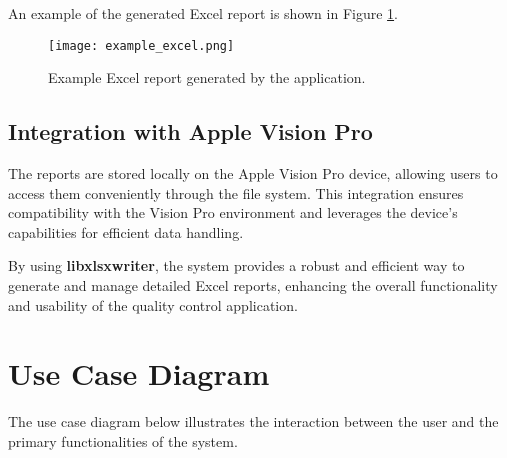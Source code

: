 An example of the generated Excel report is shown in Figure \ref{fig:example_excel}.
\begin{figure}[h!]
    \centering
    \texttt{[image: example\_excel.png]} %
    \caption{Example Excel report generated by the application.}
    \label{fig:example_excel}
\end{figure}

\subsection{Integration with Apple Vision Pro}
The reports are stored locally on the Apple Vision Pro device, allowing users to access them conveniently through the file system. This integration ensures compatibility with the Vision Pro environment and leverages the device's capabilities for efficient data handling.

By using \textbf{libxlsxwriter}, the system provides a robust and efficient way to generate and manage detailed Excel reports, enhancing the overall functionality and usability of the quality control application.



\section{Use Case Diagram}
The use case diagram below illustrates the interaction between the user and the primary functionalities of the system.


